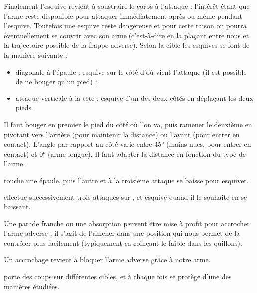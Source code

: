 Finalement l'esquive revient à soustraire le corps à l'attaque : l'intérêt étant que l'arme reste disponible pour attaquer immédiatement après ou même pendant l'esquive.
Toutefois une esquive reste dangereuse et pour cette raison on pourra éventuellement se couvrir avec son arme (c'est-à-dire en la plaçant entre nous et la trajectoire possible de la frappe adverse).
Selon la cible les esquives se font de la manière suivante :
\begin{itemize}
	\item diagonale à l'épaule : esquive sur le côté d'où vient l'attaque (il est possible de ne bouger qu'un pied) ;
	\item attaque verticale à la tête : esquive d'un des deux côtés en déplaçant les deux pieds.
\end{itemize}
Il faut bouger en premier le pied du côté où l'on va, puis ramener le deuxième en pivotant vers l'arrière (pour maintenir la distance) ou l'avant (pour entrer en contact).
L'angle par rapport au côté varie entre \ang{45} (mains nues, pour entrer en contact) et \ang{0} (arme longue).
Il faut adapter la distance en fonction du type de l'arme.


\begin{exercice}

	\A touche une épaule, puis l'autre et à la troisième attaque \D se baisse pour esquiver.
\end{exercice}


\begin{exercice}


	\A effectue successivement trois attaques sur \D, et \D esquive quand il le souhaite en se baissant.
\end{exercice}


Une parade franche ou une absorption peuvent être mise à profit pour accrocher l'arme adverse : il s'agit de l'amener dans une position qui nous permet de la contrôler plus facilement (typiquement en coinçant le faible dans les quillons).


\begin{definition}[Accrochage]

	Un accrochage revient à bloquer l'arme adverse grâce à notre arme.
\end{definition}


\begin{exercice}

	\A porte des coups sur différentes cibles, et à chaque fois \D se protège d'une des manières étudiées.
\end{exercice}



